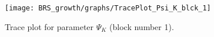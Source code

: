 \begin{figure}[H]
\centering
  \texttt{[image: BRS\_growth/graphs/TracePlot\_Psi\_K\_blck\_1]}\\
    \caption{Trace plot for parameter ${\Psi_K}$ (block number 1).}
\end{figure}
